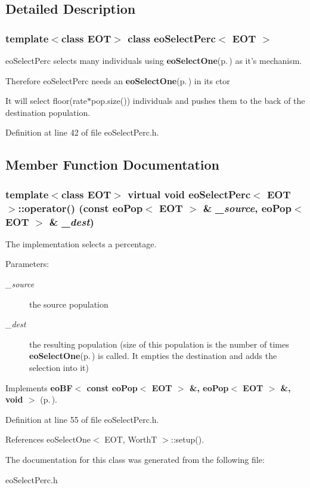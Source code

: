 \subsection{Detailed Description}
\subsubsection*{template$<$class EOT$>$ class eo\-Select\-Perc$<$ EOT $>$}

eo\-Select\-Perc selects many individuals using {\bf eo\-Select\-One}{\rm (p.\,\pageref{classeo_select_one})} as it's mechanism. 

Therefore eo\-Select\-Perc needs an {\bf eo\-Select\-One}{\rm (p.\,\pageref{classeo_select_one})} in its ctor

It will select floor(rate$\ast$pop.size()) individuals and pushes them to the back of the destination population. 



Definition at line 42 of file eo\-Select\-Perc.h.

\subsection{Member Function Documentation}
\subsubsection{\setlength{\rightskip}{0pt plus 5cm}template$<$class EOT$>$ virtual void {\bf eo\-Select\-Perc}$<$ {\bf EOT} $>$::operator() (const {\bf eo\-Pop}$<$ {\bf EOT} $>$ \& {\em \_\-source}, {\bf eo\-Pop}$<$ {\bf EOT} $>$ \& {\em \_\-dest})\hspace{0.3cm}{\tt  [inline, virtual]}}\label{classeo_select_perc_a1}


The implementation selects a percentage. 

\begin{Desc}
\item[Parameters:]
\begin{description}
\item[{\em \_\-source}]the source population \item[{\em \_\-dest}]the resulting population (size of this population is the number of times {\bf eo\-Select\-One}{\rm (p.\,\pageref{classeo_select_one})} is called. It empties the destination and adds the selection into it) \end{description}
\end{Desc}


Implements {\bf eo\-BF$<$ const eo\-Pop$<$ EOT $>$ \&, eo\-Pop$<$ EOT $>$ \&, void $>$} {\rm (p.\,\pageref{classeo_b_f_a1})}.

Definition at line 55 of file eo\-Select\-Perc.h.

References eo\-Select\-One$<$ EOT, Worth\-T $>$::setup().

The documentation for this class was generated from the following file:\begin{CompactItemize}
\item 
eo\-Select\-Perc.h\end{CompactItemize}
